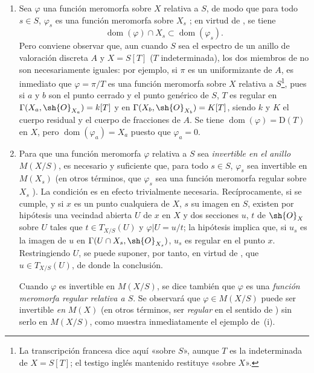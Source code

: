 \begin{remarks}[20.6.5]
\label{IV.20.6.5}
\begin{enumerate}[label=(\roman*)]
  \item Sea $\varphi$ una función meromorfa sobre $X$ relativa a $S$, de modo que para todo $s\in S$, $\varphi_s$ es una función meromorfa sobre $X_s$ ; en virtud de , se tiene
  \[
  \label{IV.20.6.5.1}
    \operatorname{dom}(\varphi)\cap X_s\subset\operatorname{dom}(\varphi_s).
    \tag{20.6.5.1}
  \]
  Pero conviene observar que, aun cuando $S$ sea el espectro de un anillo de valoración discreta $A$ y $X=S[T]$ ($T$ indeterminada), los dos miembros de  no son necesariamente iguales: por ejemplo, si $\pi$ es un uniformizante de $A$, es inmediato que $\varphi=\pi/T$ es una función meromorfa sobre $X$ relativa a $S$\footnote{La transcripción francesa dice aquí «sobre $S$», aunque $T$ es la indeterminada de $X=S[T]$; el testigo inglés mantenido restituye «sobre $X$».}, pues si $a$ y $b$ son el punto cerrado y el punto genérico de $S$, $T$ es regular en $\Gamma(X_a,\sh{O}_{X_a})=k[T]$ y en $\Gamma(X_b,\sh{O}_{X_b})=K[T]$, siendo $k$ y $K$ el cuerpo residual y el cuerpo de fracciones de $A$.
  Se tiene $\operatorname{dom}(\varphi)=\mathrm{D}(T)$ en $X$, pero $\operatorname{dom}(\varphi_a)=X_a$ puesto que $\varphi_a=0$.

  \item Para que una función meromorfa $\varphi$ relativa a $S$ sea \emph{invertible en el anillo} $M(X/S)$, es necesario y suficiente que, para todo $s\in S$, $\varphi_s$ sea invertible en $M(X_s)$ (en otros términos, que $\varphi_s$ sea una función meromorfa regular sobre $X_s$ ).
  La condición es
  en efecto trivialmente necesaria.
  Recíprocamente, si se cumple, y si $x$ es un punto cualquiera de $X$, $s$ su imagen en $S$, existen por hipótesis una vecindad abierta $U$ de $x$ en $X$ y dos secciones $u$, $t$ de $\sh{O}_X$ sobre $U$ tales que $t\in T_{X/S}(U)$ y $\varphi|U=u/t$; la hipótesis implica que, si $u_s$ es la imagen de $u$ en $\Gamma(U\cap X_s,\sh{O}_{X_s})$, $u_s$ es regular en el punto $x$.
  Restringiendo $U$, se puede suponer, por tanto, en virtud de , que $u\in T_{X/S}(U)$, de donde la conclusión.

  Cuando $\varphi$ es invertible en $M(X/S)$, se dice también que $\varphi$ es una \emph{función meromorfa regular relativa a $S$}.
  Se observará que $\varphi\in M(X/S)$ puede ser invertible \emph{en} $M(X)$ (en otros términos, ser \emph{regular} en el sentido de ) sin serlo en $M(X/S)$, como muestra inmediatamente el ejemplo de~(i).


\end{enumerate}
\end{remarks}
